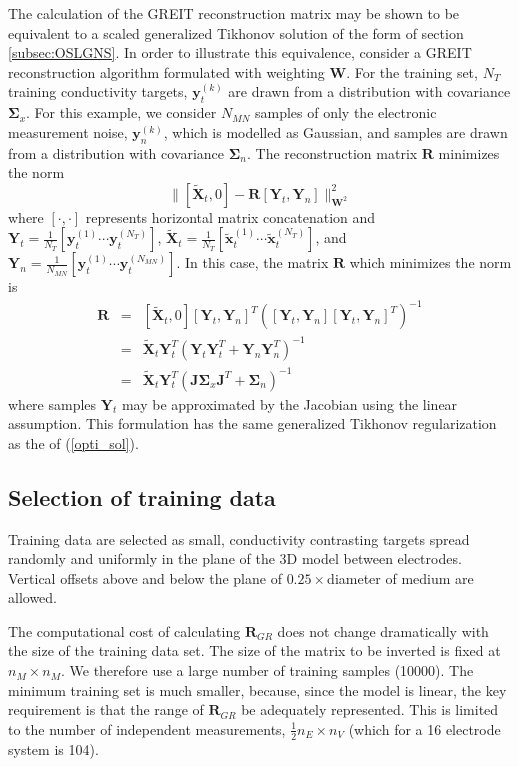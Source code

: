 \documentclass[12pt]{iopart}
\newcommand{\xT}{\mbox{$\mathbf{\tilde x}$}}
\newcommand{\XT}{\mbox{$\mathbf{\tilde X}$}}
\newcommand{\yB}{\mbox{$\mathbf{y}$}}
\newcommand{\RB}{\mbox{$\mathbf{R}$}}
\newcommand{\JB}{\mbox{$\mathbf{J}$}}
\newcommand{\WB}{\mbox{$\mathbf{W}$}}
\newcommand{\YB}{\mbox{$\mathbf{Y}$}}
\newcommand{\SG}{\mbox{${\boldsymbol \Sigma}$}}
\begin{document}
The calculation of the GREIT reconstruction matrix
may be shown to be equivalent to a scaled generalized
Tikhonov solution of the form of section \ref{subsec:OSLGNS}.
In order to illustrate this equivalence, consider
a GREIT reconstruction algorithm formulated
with weighting $\WB$. For the training set,
$N_T$ training conductivity targets, $\yB_t^{(k)}$ are drawn from
a distribution with covariance $\SG_x$.
For this example, we consider $N_{MN}$ samples of only the electronic
measurement noise, $\yB_n^{(k)}$, which is modelled as Gaussian,
and samples are drawn from a distribution with 
covariance $\SG_n$. The reconstruction matrix $\RB$ minimizes
the norm
\begin{equation}
\| [ \XT_t, 0 ] - \RB [ \YB_t, \YB_n ] \|_{\WB^2}^2
\end{equation}
where $[\cdot,\cdot]$ represents horizontal
matrix concatenation and
$\YB_t = \frac{1}{N_T}    [ \yB_t^{(1)} \cdots \yB_t^{(N_T)} ]$,
$\XT_t = \frac{1}{N_T}    [ \xT_t^{(1)} \cdots \xT_t^{(N_T)} ]$,
and 
$\YB_n = \frac{1}{N_{MN}} [ \yB_t^{(1)} \cdots \yB_t^{(N_{MN})} ]$.
In this case, the matrix $\RB$ which minimizes the norm is 
\begin{eqnarray}
\RB &=& [ \XT_t, 0 ] [\YB_t, \YB_n]^T
     \left( [\YB_t, \YB_n] [\YB_t, \YB_n]^T \right)^{-1}
\nonumber \\
    &=& \XT_t \YB_t^T \left( \YB_t \YB_t^T + \YB_n \YB_n^T \right)^{-1}
\nonumber \\
    &=& \XT_t \YB_t^T \left( \JB \SG_x \JB^T + \SG_n \right)^{-1}
\end{eqnarray}
where samples $\YB_t$ may be approximated by the Jacobian
using the linear assumption. This formulation 
has the same generalized Tikhonov regularization as the
of (\ref{opti_sol}).


\subsection{Selection of training data}
\label{subsec:training_data}

Training data are selected as small, conductivity contrasting
targets spread randomly and uniformly in the plane of the 3D model
between electrodes. Vertical offsets above and below the
plane of $0.25\times$diameter of medium are allowed.

The computational cost of calculating $\RB_{GR}$ does
not change dramatically with the size of the training data
set. The size of the matrix to be inverted is fixed at
$n_M \times n_M$. We therefore use a large number of
training samples (10000). The minimum training set 
is much smaller, because, since the model is
linear, the key requirement is that the range of 
$\RB_{GR}$ be adequately represented. This is limited
to the number of independent measurements,
$\frac{1}{2} n_E \times n_V$ (which for a 16 electrode
system is 104).
\end{document}
